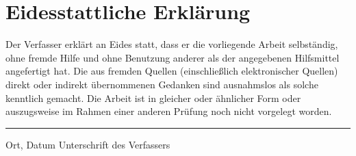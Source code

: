 %
%

\pagestyle{empty}
%
\chapter*{Eidesstattliche Erklärung}
%
Der Verfasser erklärt an Eides statt, 
dass er die vorliegende Arbeit selbständig, 
ohne fremde Hilfe und ohne Benutzung anderer als der angegebenen 
Hilfsmittel angefertigt hat. 
Die aus fremden Quellen (einschließlich elektronischer Quellen) direkt 
oder indirekt übernommenen Gedanken sind ausnahmslos als solche kenntlich gemacht. 
Die Arbeit ist in gleicher oder ähnlicher Form oder auszugsweise im 
Rahmen einer anderen Prüfung noch nicht vorgelegt worden.
\vspace{2.0cm}
%
\hrule
Ort, Datum  \hspace*{.55\textwidth} Unterschrift des Verfassers 
%
